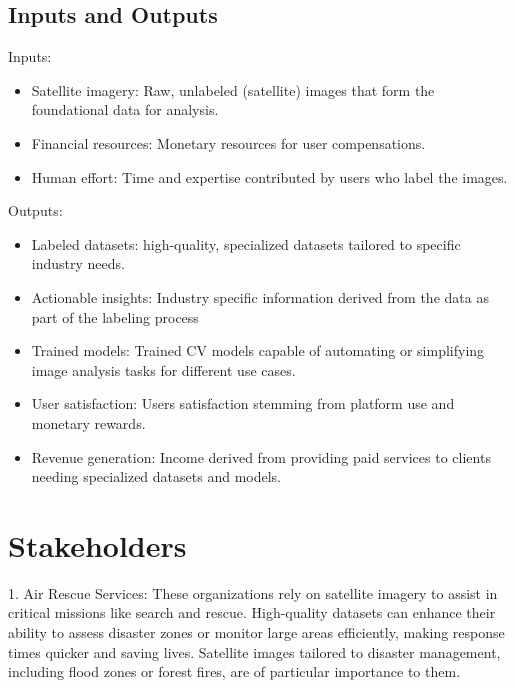 \documentclass{article}
\begin{document}
\newpage{}
\subsection{Inputs and Outputs}

Inputs:

\begin{itemize}
    \item Satellite imagery: Raw, unlabeled (satellite) images that form the foundational data for analysis.
    \item Financial resources: Monetary resources for user compensations.
    \item Human effort: Time and expertise contributed by users who label the images.
\end{itemize}

Outputs:

\begin{itemize}
    \item Labeled datasets: high-quality, specialized datasets tailored to specific industry needs.
    \item Actionable insights: Industry specific information derived from the data as part of the labeling process
    \item Trained models: Trained CV models capable of automating or simplifying image analysis tasks for different use cases.
    \item User satisfaction: Users satisfaction stemming from platform use and monetary rewards.
    \item Revenue generation: Income derived from providing paid services to clients needing specialized datasets and models.
\end{itemize}

\section{Stakeholders}

1.	Air Rescue Services: These organizations rely on satellite imagery to assist in critical missions like search and rescue. High-quality datasets can enhance their ability to assess disaster zones or monitor large areas efficiently, making response times quicker and saving lives. Satellite images tailored to disaster management, including flood zones or forest fires, are of particular importance to them. \\
\\
\end{document}
